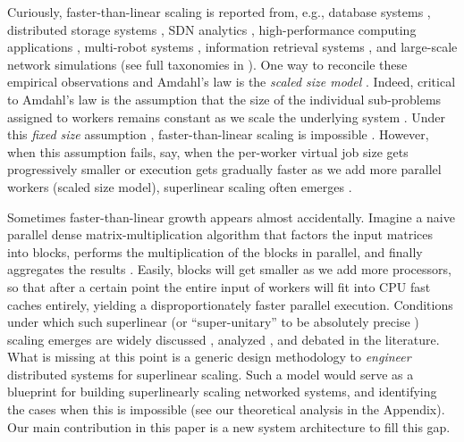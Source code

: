Curiously, faster-than-linear scaling is reported from, e.g., database systems \cite{scalability-analyzed, 10.5555/1012889.1012894}, distributed storage systems \cite{271208, dobb-2, icsoft20}, SDN analytics \cite{sdn-analytitcs}, high-performance computing applications \cite{556383, 7733347, 6483679}, multi-robot systems \cite{10.1007/978-3-319-77610-1}, information retrieval systems \cite{dobb-1, dobb-2}, and large-scale network simulations \cite{10.1145/3627703.3629574} (see full taxonomies in \cite{7733347, 80148}). %
One way to reconcile these empirical observations and Amdahl's law is the \emph{scaled size model} \cite{556383}. Indeed, critical to Amdahl's law is the assumption that the size of the individual sub-problems assigned to workers remains constant as we scale the underlying system \cite{10.1145/42411.42415}. Under this \emph{fixed size} assumption \cite{556383}, faster-than-linear scaling is impossible \cite{10.1016/0167-8191(86)90024-4}. However, when this assumption fails, say, when the per-worker virtual job size gets progressively smaller or execution gets gradually faster as we add more parallel workers (scaled size model), superlinear scaling often emerges \cite{scalability-analyzed, sdn-analytitcs, 6483679, 10.1007/978-3-319-77610-1}.

Sometimes faster-than-linear growth appears almost accidentally. Imagine a naive parallel dense matrix-multiplication algorithm that factors the input matrices into blocks, performs the multiplication of the blocks in parallel, and finally aggregates the results \cite{7733347}. Easily, blocks will get smaller as we add more processors, so that after a certain point the entire input of workers will fit into CPU fast caches entirely, yielding a disproportionately faster parallel execution. Conditions under which such superlinear (or ``super-unitary'' to be absolutely precise \cite{80148}) scaling emerges are widely discussed \cite{556383, dobb-1, dobb-2}, analyzed \cite{80148, 7733347}, and debated \cite{gunther-hotsos, 10.1016/0167-8191(86)90024-4, 10.1145/2773212.2789974} in the literature. What is missing at this point is a generic design methodology to \emph{engineer} distributed systems for superlinear scaling. Such a model would serve as a blueprint for building superlinearly scaling networked systems, and identifying the cases when this is impossible (see our theoretical analysis in the Appendix). Our main contribution in this paper is a new system architecture to fill this gap.

